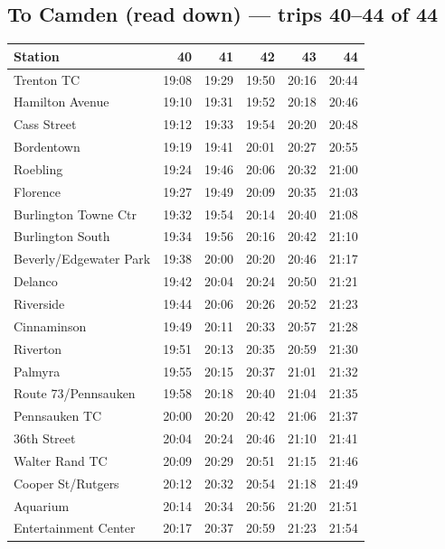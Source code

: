 \subsection*{To Camden (read down) --- trips 40--44 of 44}
\begin{center}\footnotesize\setlength{\tabcolsep}{3pt}\begin{tabular}{@{}lrrrrr@{}}\toprule
Station & 40 & 41 & 42 & 43 & 44 \\\midrule
Trenton TC & 19:08 & 19:29 & 19:50 & 20:16 & 20:44 \\
Hamilton Avenue & 19:10 & 19:31 & 19:52 & 20:18 & 20:46 \\
Cass Street & 19:12 & 19:33 & 19:54 & 20:20 & 20:48 \\
Bordentown & 19:19 & 19:41 & 20:01 & 20:27 & 20:55 \\
Roebling & 19:24 & 19:46 & 20:06 & 20:32 & 21:00 \\
Florence & 19:27 & 19:49 & 20:09 & 20:35 & 21:03 \\
Burlington Towne Ctr & 19:32 & 19:54 & 20:14 & 20:40 & 21:08 \\
Burlington South & 19:34 & 19:56 & 20:16 & 20:42 & 21:10 \\
Beverly/Edgewater Park & 19:38 & 20:00 & 20:20 & 20:46 & 21:17 \\
Delanco & 19:42 & 20:04 & 20:24 & 20:50 & 21:21 \\
Riverside & 19:44 & 20:06 & 20:26 & 20:52 & 21:23 \\
Cinnaminson & 19:49 & 20:11 & 20:33 & 20:57 & 21:28 \\
Riverton & 19:51 & 20:13 & 20:35 & 20:59 & 21:30 \\
Palmyra & 19:55 & 20:15 & 20:37 & 21:01 & 21:32 \\
Route 73/Pennsauken & 19:58 & 20:18 & 20:40 & 21:04 & 21:35 \\
Pennsauken TC & 20:00 & 20:20 & 20:42 & 21:06 & 21:37 \\
36th Street & 20:04 & 20:24 & 20:46 & 21:10 & 21:41 \\
Walter Rand TC & 20:09 & 20:29 & 20:51 & 21:15 & 21:46 \\
Cooper St/Rutgers & 20:12 & 20:32 & 20:54 & 21:18 & 21:49 \\
Aquarium & 20:14 & 20:34 & 20:56 & 21:20 & 21:51 \\
Entertainment Center & 20:17 & 20:37 & 20:59 & 21:23 & 21:54 \\
\bottomrule\end{tabular}\end{center}
\clearpage
